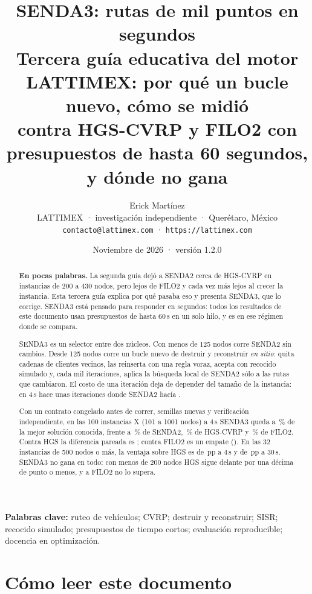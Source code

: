 \documentclass[11pt,a4paper]{article}
\title{\textbf{SENDA3: rutas de mil puntos en segundos}\\[0.4em]
\large Tercera guía educativa del motor LATTIMEX: por qué un bucle nuevo, cómo se midió\\
contra HGS-CVRP y FILO2 con presupuestos de hasta 60 segundos, y dónde no gana}
\author{Erick Martínez\\
\small LATTIMEX · investigación independiente · Querétaro, México\\
\small \texttt{contacto@lattimex.com} · \texttt{https://lattimex.com}}
\date{Noviembre de 2026 · versión 1.2.0}
\newcommand{\sendados}{SENDA2}
\newcommand{\sendatres}{SENDA3}
\newcommand{\pp}{\,pp}
\begin{document}
\maketitle
\thispagestyle{licenciaguia}

\begin{abstract}
\noindent\textbf{En pocas palabras.} La segunda guía dejó a \sendados{} cerca de HGS-CVRP en instancias
de 200 a 430 nodos, pero lejos de FILO2 y cada vez más lejos al crecer la instancia. Esta tercera guía
explica por qué pasaba eso y presenta \sendatres, que lo corrige. \sendatres{} está pensado para
responder en segundos: todos los resultados de este documento usan presupuestos de hasta 60\,s en un
solo hilo, y es en ese régimen donde se compara.

\smallskip
\noindent \sendatres{} es un selector entre dos núcleos. Con menos de 125 nodos corre \sendados{} sin
cambios. Desde 125 nodos corre un bucle nuevo de destruir y reconstruir \emph{en sitio}: quita cadenas
de clientes vecinos, las reinserta con una regla voraz, acepta con recocido simulado y, cada mil
iteraciones, aplica la búsqueda local de \sendados{} sólo a las rutas que cambiaron. El costo de una
iteración deja de depender del tamaño de la instancia: en 4\,s hace unas \IterTres{} iteraciones donde
\sendados{} hacía \IterDos.

\smallskip
\noindent Con un contrato congelado antes de correr, semillas nuevas y verificación independiente, en
las 100 instancias X (101 a 1001 nodos) a 4\,s \sendatres{} queda a \TresX\,\% de la mejor solución
conocida, frente a \DosX\,\% de \sendados, \HgsX\,\% de HGS-CVRP y \FiloX\,\% de FILO2. Contra HGS la
diferencia pareada es \DXTresHgs; contra FILO2 es un empate (\DXTresFilo). En las 32 instancias de 500
nodos o más, la ventaja sobre HGS es de \DCurHgsIVMedia\pp{} a 4\,s y de \DCurHgsXXXMedia\pp{} a 30\,s.
\sendatres{} no gana en todo: con menos de 200 nodos HGS sigue delante por una décima de punto o menos,
y a FILO2 no lo supera.
\end{abstract}

\noindent\textbf{Palabras clave:} ruteo de vehículos; CVRP; destruir y reconstruir; SISR; recocido
simulado; presupuestos de tiempo cortos; evaluación reproducible; docencia en optimización.

\tableofcontents
\newpage

\section*{Cómo leer este documento}
\end{document}
